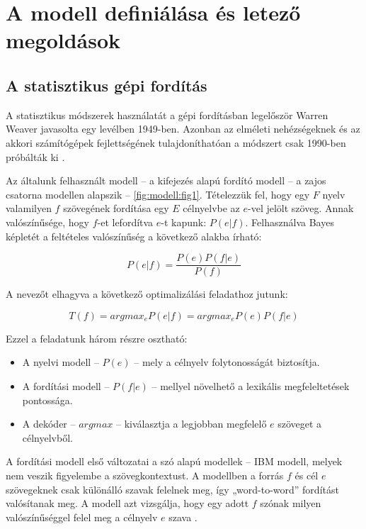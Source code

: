 \section{A modell definiálása és letező megoldások} \label{sec:model_definition}



\subsection{A statisztikus gépi fordítás}

A statisztikus módszerek használatát a gépi fordításban legelőször Warren Weaver javasolta egy levélben 1949-ben. Azonban az elméleti nehézségeknek és az akkori számítógépek fejlettségének tulajdoníthatóan a módszert csak 1990-ben próbálták ki \cite{Brown:1990:SAM:92858.92860}.

Az általunk felhasznált modell -- a kifejezés alapú fordító modell -- a zajos csatorna modellen alapszik -- \ref{fig:modell:fig1}. Tételezzük fel, hogy egy $F$ nyelv valamilyen $f$ szövegének fordítása egy $E$ célnyelvbe az $e$-vel jelölt szöveg. Annak valószínűsége, hogy $f$-et lefordítva $e$-t kapunk: $P(e|f)$. Felhasználva Bayes képletét a feltételes valószínűség a következő alakba írható:

\begin{equation}
	P(e|f) = \frac{P(e)P(f|e)}{P(f)}
\end{equation}

A nevezőt elhagyva a következő optimalizálási feladathoz jutunk:

\begin{equation}
	T(f) = argmax_e P(e|f) = argmax_e P(e)P(f|e)
\end{equation} 

Ezzel a feladatunk három részre osztható: 
\begin{itemize}
	\item
		A nyelvi modell --  $P(e)$ -- mely a célnyelv folytonosságát biztosítja.
	\item
		A fordítási modell --  $P(f|e)$ -- mellyel növelhető a lexikális megfeleltetések pontossága.
	\item
		A dekóder -- $argmax$ -- kiválasztja a legjobban megfelelő $e$ szöveget a célnyelvből.
\end{itemize}

A fordítási modell első változatai a szó alapú modellek -- IBM modell, melyek nem veszik figyelembe a szövegkontextust. A modellben a forrás $f$ és cél $e$ szövegeknek csak különálló szavak felelnek meg, így „word-to-word” fordítást valósítanak meg. A modell azt vizsgálja, hogy egy adott $f$ szónak milyen valószínűséggel felel meg a célnyelv $e$ szava \cite{Brown:1990:SAM:92858.92860} \cite{Berger:1994}.

